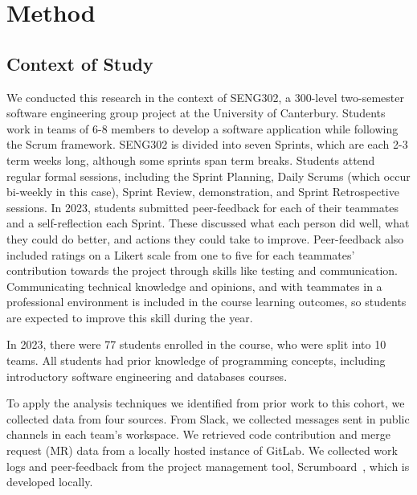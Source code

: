 \section{Method}
\label{method}

\subsection{Context of Study}
We conducted this research in the context of SENG302, a 300-level two-semester software engineering group project at the University of Canterbury. Students work in teams of 6-8 members to develop a software application while following the Scrum framework. SENG302 is divided into seven Sprints, which are each 2-3 term weeks long, although some sprints span term breaks. Students attend regular formal sessions, including the Sprint Planning, Daily Scrums (which occur bi-weekly in this case), Sprint Review, demonstration, and Sprint Retrospective sessions. In 2023, students submitted peer-feedback for each of their teammates and a self-reflection each Sprint. These discussed what each person did well, what they could do better, and actions they could take to improve. Peer-feedback also included ratings on a Likert scale from one to five for each teammates' contribution towards the project through skills like testing and communication. Communicating technical knowledge and opinions, and with teammates in a professional environment is included in the course learning outcomes, so students are expected to improve this skill during the year.

In 2023, there were 77 students enrolled in the course, who were split into 10 teams. 
All students had prior knowledge of programming concepts, including introductory software engineering and databases courses.


To apply the analysis techniques we identified from prior work to this cohort, we collected data from four sources. From Slack, we collected messages sent in public channels in each team's workspace. We retrieved code contribution and merge request (MR) data from a locally hosted instance of GitLab. We collected work logs and peer-feedback from the project management tool, Scrumboard~\cite{minish}, which is developed locally. 

